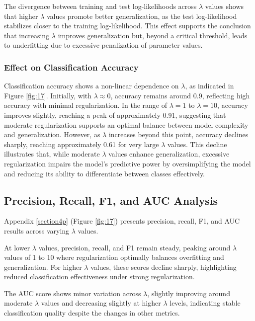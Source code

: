 \documentclass[a4paper,oneside,bibliography=totoc]{scrartcl}
\begin{document}
The divergence between training and test log-likelihoods across $\lambda$ values shows that higher $\lambda$ values promote better generalization, as the test log-likelihood stabilizes closer to the training log-likelihood. This effect supports the conclusion that increasing $\lambda$ improves generalization but, beyond a critical threshold, leads to underfitting due to excessive penalization of parameter values.

\subsubsection{Effect on Classification Accuracy}

Classification accuracy shows a non-linear dependence on $\lambda$, as indicated in Figure \ref{fig:17}. Initially, with $\lambda \approx 0$, accuracy remains around 0.9, reflecting high accuracy with minimal regularization. In the range of $\lambda = 1$ to $\lambda = 10$, accuracy improves slightly, reaching a peak of approximately 0.91, suggesting that moderate regularization supports an optimal balance between model complexity and generalization. However, as $\lambda$ increases beyond this point, accuracy declines sharply, reaching approximately 0.61 for very large $\lambda$ values. This decline illustrates that, while moderate $\lambda$ values enhance generalization, excessive regularization impairs the model’s predictive power by oversimplifying the model and reducing its ability to differentiate between classes effectively.

\subsection{Precision, Recall, F1, and AUC Analysis}

Appendix \ref{section4p} (Figure \ref{fig:17}) presents precision, recall, F1, and AUC results across varying $\lambda$ values. 

At lower $\lambda$ values, precision, recall, and F1 remain steady, peaking around $\lambda$ values of 1 to 10 where regularization optimally balances overfitting and generalization. For higher $\lambda$ values, these scores decline sharply, highlighting reduced classification effectiveness under strong regularization.

The AUC score shows minor variation across $\lambda$, slightly improving around moderate $\lambda$ values and decreasing slightly at higher $\lambda$ levels, indicating stable classification quality despite the changes in other metrics.
\end{document}
